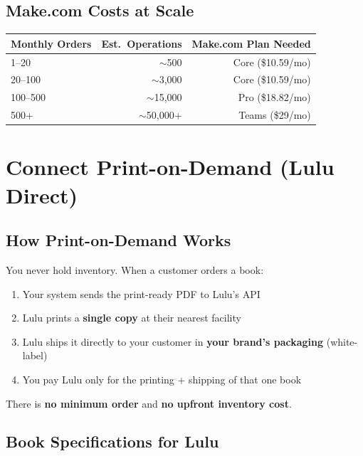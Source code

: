 \documentclass[12pt, letterpaper, oneside]{book}
\begin{document}
\section{Make.com Costs at Scale}

\begin{table}[H]
\centering
\begin{tabular}{lrr}
\toprule
\textbf{Monthly Orders} & \textbf{Est.\ Operations} & \textbf{Make.com Plan Needed} \\
\midrule
1--20 & $\sim$500 & Core (\$10.59/mo) \\
20--100 & $\sim$3{,}000 & Core (\$10.59/mo) \\
100--500 & $\sim$15{,}000 & Pro (\$18.82/mo) \\
500+ & $\sim$50{,}000+ & Teams (\$29/mo) \\
\bottomrule
\end{tabular}
\end{table}


\chapter{Connect Print-on-Demand (Lulu Direct)}

\section{How Print-on-Demand Works}

You never hold inventory. When a customer orders a book:

\begin{enumerate}[leftmargin=2em]
  \item Your system sends the print-ready PDF to Lulu's API
  \item Lulu prints a \textbf{single copy} at their nearest facility
  \item Lulu ships it directly to your customer in \textbf{your brand's packaging} (white-label)
  \item You pay Lulu only for the printing + shipping of that one book
\end{enumerate}

\noindent There is \textbf{no minimum order} and \textbf{no upfront inventory cost}.

\section{Book Specifications for Lulu}
\end{document}
